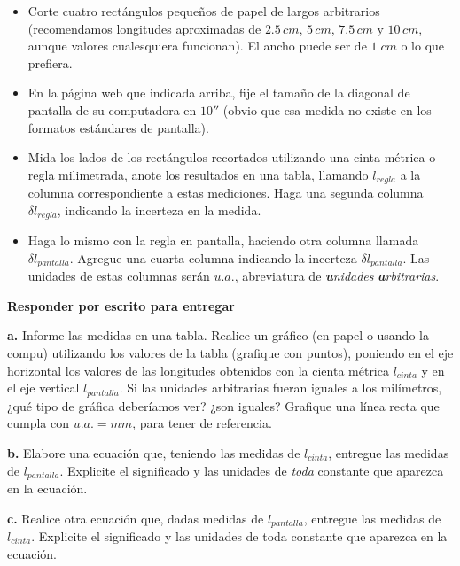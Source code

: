 \documentclass[10pt,a4paper]{article}
\numberwithin{equation}{section}%
\numberwithin{equation}{subsection}
\begin{document}
\begin{itemize}

\item[a)] Corte cuatro rectángulos pequeños de papel de largos arbitrarios (recomendamos longitudes aproximadas de $2.5 \,cm$, $5 \,cm$, $7.5\, cm$ y $10 \, cm$, aunque valores cualesquiera funcionan). El ancho puede ser de $1 \; cm$ o lo que prefiera.

\item[b)] En la página web que indicada arriba, fije el tamaño de la diagonal de pantalla de su computadora en $10''$ (obvio que esa medida no existe en los formatos estándares de pantalla).

\item[c)] Mida los lados de los rectángulos recortados utilizando una cinta métrica o regla milimetrada, anote los resultados en una tabla, llamando $l_{regla}$ a la columna correspondiente a estas mediciones. Haga una segunda columna $\delta l_{regla}$, indicando la incerteza en la medida.

\item[b)] Haga lo mismo con la regla en pantalla, haciendo otra columna llamada $\delta l_{pantalla}$. Agregue una cuarta columna indicando la incerteza $\delta l_{pantalla}$. Las unidades de estas columnas serán $u.a.$, abreviatura de \textit{\textbf{u}nidades} \textit{\textbf{a}rbitrarias}.
\end{itemize}

\textbf{Responder por escrito para entregar}

\noindent \textbf{a.} Informe las medidas en una tabla. Realice un gráfico (en papel o usando la compu) utilizando los valores de la tabla (grafique con puntos), poniendo en el eje horizontal los valores de las longitudes obtenidos con la cienta métrica $l_{cinta}$ y en el eje vertical $l_{pantalla}$. Si las unidades arbitrarias fueran iguales a los milímetros, ¿qué tipo de gráfica deberíamos ver? ¿son iguales? Grafique una línea recta que cumpla con $u.a. = mm$, para tener de referencia.

\noindent \textbf{b.} Elabore una ecuación que, teniendo las medidas de $l_{cinta}$, entregue las medidas de $l_{pantalla}$. Explicite el significado y las unidades de \textit{toda} constante que aparezca en la ecuación.

\noindent \textbf{c.} Realice otra ecuación que, dadas medidas de $l_{pantalla}$, entregue las medidas de $l_{cinta}$. Explicite el significado y las unidades de toda constante que aparezca en la ecuación.
\end{document}
